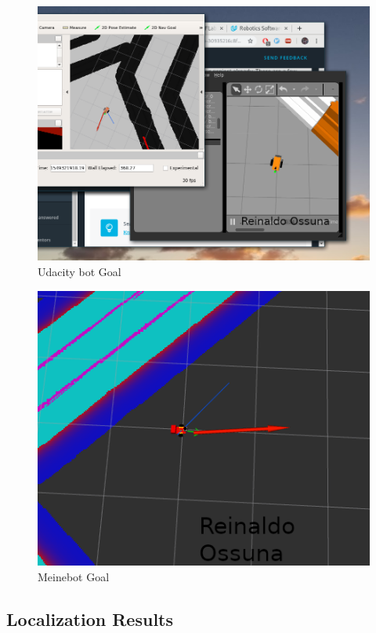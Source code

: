 \documentclass[10pt,journal,compsoc]{IEEEtran}
\begin{document}
\begin{figure}[thpb]
      \centering
      \includegraphics[width=\linewidth]{udacity-bot.png}
      \caption{Udacity bot Goal}
      \label{fig:udacitybot}
\end{figure}

\begin{figure}[thpb]
      \centering
      \includegraphics[width=\linewidth]{meine_bot_checkpoint.png}
      \caption{Meinebot Goal}
      \label{fig:meinebot}
\end{figure}



\subsection{Localization Results}
\end{document}
